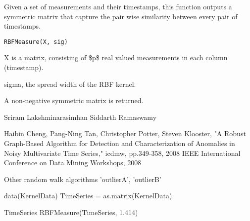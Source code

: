 \begin{Description}\relax
Given a set of measurements and their timestamps, this function outputs a symmetric matrix that capture the pair wise similarity between every pair of timestamps.
\end{Description}
\begin{Usage}
\begin{verbatim}
RBFMeasure(X, sig)
\end{verbatim}
\end{Usage}
\begin{Arguments}
\begin{ldescription}
\item[\code{X}] X is a matrix, consisting of \$p\$ real valued measurements in each column (timestamp).

\item[\code{sig}] sigma, the spread width of the RBF kernel.

\end{ldescription}
\end{Arguments}
\begin{Value}
A non-negative symmetric matrix is returned.
\end{Value}
\begin{Author}\relax
Sriram Lakshminarasimhan        
Siddarth Ramaswamy
\end{Author}
\begin{References}\relax
Haibin Cheng, Pang-Ning Tan, Christopher Potter, Steven Klooster, "A Robust Graph-Based Algorithm for Detection and Characterization of Anomalies in Noisy Multivariate Time Series," icdmw, pp.349-358, 2008 IEEE International Conference on Data Mining Workshops, 2008
\end{References}
\begin{SeeAlso}\relax
Other random walk algorithms 'outlierA', 'outlierB'
\end{SeeAlso}
\begin{Examples}
\begin{ExampleCode}
data(KernelData)
TimeSeries = as.matrix(KernelData)

TimeSeries
RBFMeasure(TimeSeries, 1.414)
\end{ExampleCode}
\end{Examples}

